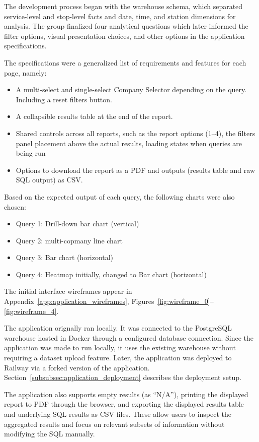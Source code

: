 The development process began with the warehouse schema, which separated service-level and stop-level facts and date, time, and station dimensions for analysis. The group finalized four analytical questions which later informed the filter options, visual presentation choices, and other options in the application specifications. 

The specifications were a generalized list of requirements and features for each page, namely:
\begin{itemize}
    \item A multi-select and single-select Company Selector depending on the query. Including a reset filters button.
    \item A collapsible results table at the end of the report.
    \item Shared controls across all reports, such as the report options (1--4), the filters panel placement above the actual results, loading states when queries are being run
    \item Options to download the report as a PDF and outputs (results table and raw SQL output) as CSV.
\end{itemize} 

Based on the expected output of each query, the following charts were also chosen:
\begin{itemize}
    \item Query 1: Drill-down bar chart (vertical)
    \item Query 2: multi-copmany line chart
    \item Query 3: Bar chart (horizontal)
    \item Query 4: Heatmap initially, changed to Bar chart (horizontal)
\end{itemize}

The initial interface wireframes appear in Appendix~\ref{app:application_wireframes}, Figures~\ref{fig:wireframe_0}--\ref{fig:wireframe_4}.

The application orignally ran locally. It was connected to the PostgreSQL warehouse hosted in Docker through a configured database connection. Since the application was made to run locally, it uses the existing warehouse without requiring a dataset upload feature. Later, the application was deployed to Railway via a forked version of the application. Section~\ref{subsubsec:application_deployment} describes the deployment setup.

The application also supports empty results (as ``N/A''), printing the displayed report to PDF through the browser, and exporting the displayed results table and underlying SQL results as CSV files. These allow users to inspect the aggregated results and focus on relevant subsets of information without modifying the SQL manually. 

